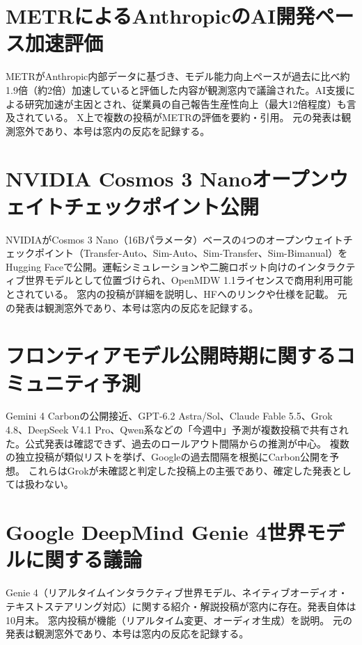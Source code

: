 \section{METRによるAnthropicのAI開発ペース加速評価}
METRがAnthropic内部データに基づき、モデル能力向上ペースが過去に比べ約1.9倍（約2倍）加速していると評価した内容が観測窓内で議論された。AI支援による研究加速が主因とされ、従業員の自己報告生産性向上（最大12倍程度）も言及されている。 X上で複数の投稿がMETRの評価を要約・引用。 元の発表は観測窓外であり、本号は窓内の反応を記録する。

\section{NVIDIA Cosmos 3 Nanoオープンウェイトチェックポイント公開}
NVIDIAがCosmos 3 Nano（16Bパラメータ）ベースの4つのオープンウェイトチェックポイント（Transfer-Auto、Sim-Auto、Sim-Transfer、Sim-Bimanual）をHugging Faceで公開。運転シミュレーションや二腕ロボット向けのインタラクティブ世界モデルとして位置づけられ、OpenMDW 1.1ライセンスで商用利用可能とされている。 窓内の投稿が詳細を説明し、HFへのリンクや仕様を記載。 元の発表は観測窓外であり、本号は窓内の反応を記録する。

\section{フロンティアモデル公開時期に関するコミュニティ予測}
Gemini 4 Carbonの公開接近、GPT-6.2 Astra/Sol、Claude Fable 5.5、Grok 4.8、DeepSeek V4.1 Pro、Qwen系などの「今週中」予測が複数投稿で共有された。公式発表は確認できず、過去のロールアウト間隔からの推測が中心。 複数の独立投稿が類似リストを挙げ、Googleの過去間隔を根拠にCarbon公開を予想。 これらはGrokが未確認と判定した投稿上の主張であり、確定した発表としては扱わない。

\section{Google DeepMind Genie 4世界モデルに関する議論}
Genie 4（リアルタイムインタラクティブ世界モデル、ネイティブオーディオ・テキストステアリング対応）に関する紹介・解説投稿が窓内に存在。発表自体は10月末。 窓内投稿が機能（リアルタイム変更、オーディオ生成）を説明。 元の発表は観測窓外であり、本号は窓内の反応を記録する。

